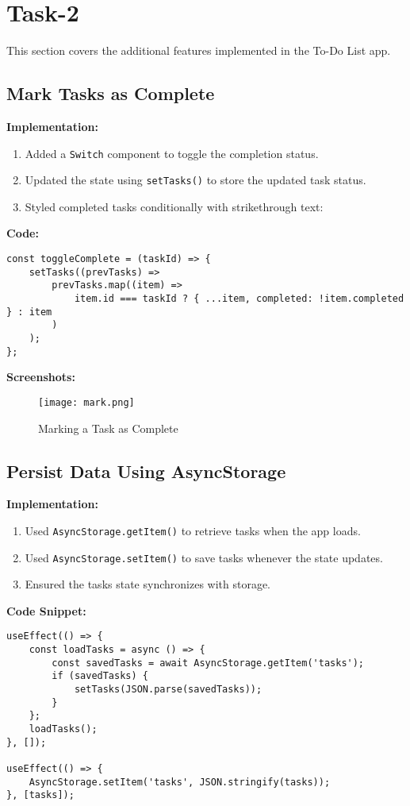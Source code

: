 \documentclass{article}
\begin{document}
\section{Task-2}
This section covers the additional features implemented in the To-Do List app.

\subsection{ Mark Tasks as Complete }


\textbf{Implementation:}
\begin{enumerate}
    \item Added a \texttt{Switch} component to toggle the completion status.
    \item Updated the state using \texttt{setTasks()} to store the updated task status.
    \item Styled completed tasks conditionally with strikethrough text:
\end{enumerate}

\textbf{Code:}
\begin{lstlisting}
const toggleComplete = (taskId) => {
    setTasks((prevTasks) =>
        prevTasks.map((item) =>
            item.id === taskId ? { ...item, completed: !item.completed } : item
        )
    );
};
\end{lstlisting}
\textbf{Screenshots:}
\begin{figure}[H]
    \centering
    \texttt{[image: mark.png]}
    \caption{Marking a Task as Complete}
    \label{fig:mark-complete}
\end{figure}


\subsection{ Persist Data Using AsyncStorage }
\textbf{Implementation:}
\begin{enumerate}
    \item Used \texttt{AsyncStorage.getItem()} to retrieve tasks when the app loads.
    \item Used \texttt{AsyncStorage.setItem()} to save tasks whenever the state updates.
    \item Ensured the tasks state synchronizes with storage.
\end{enumerate}

\textbf{Code Snippet:}
\begin{lstlisting}
useEffect(() => {
    const loadTasks = async () => {
        const savedTasks = await AsyncStorage.getItem('tasks');
        if (savedTasks) {
            setTasks(JSON.parse(savedTasks));
        }
    };
    loadTasks();
}, []);

useEffect(() => {
    AsyncStorage.setItem('tasks', JSON.stringify(tasks));
}, [tasks]);
\end{lstlisting}
\end{document}
